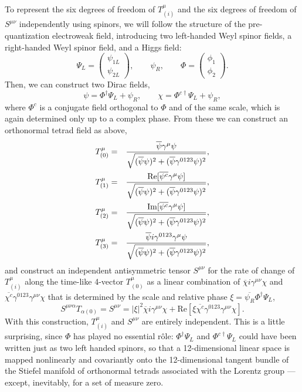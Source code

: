 \documentclass[a4paper,twocolumn,showpacs,preprintnumbers,aps]{revtex4}
\begin{document}
To represent the six degrees of freedom of $T^\mu_{(i)}$ and the six degrees of
freedom of $S^{\mu\nu}$ independently using spinors, we will follow the structure
of the pre-quantization electroweak field, introducing two left-handed Weyl spinor
fields, a right-handed Weyl spinor field, and a Higgs field:
$$\Psi_L=\left(\begin{array}{c}\psi_{1L}\\ \psi_{2L}\end{array}\right),\qquad \psi_R,\qquad
     \Phi=\left(\begin{array}{c}\phi_1\\ \phi_2\end{array}\right).$$
Then, we can construct two Dirac fields,
$$\psi=\Phi^\dagger\Psi_L+\psi_R,\qquad\chi=\Phi^{c\dagger}\Psi_L+\psi_R,$$
where $\Phi^c$ is a conjugate field orthogonal to $\Phi$ and of the same scale,
which is again determined only up to a complex phase. From these we can construct
an orthonormal tetrad field as above,
\begin{eqnarray*}
    T^\mu_{(0)}&=&\frac{\overline{\psi}\gamma^\mu\psi}{{\sqrt{(\overline{\psi}\psi)^2+(\overline{\psi}\gamma^{0123}\psi)^2}}},\cr
    T^\mu_{(1)}&=&\frac{\mathrm{Re}[\overline{\psi^c}\gamma^\mu\psi]}{{\sqrt{(\overline{\psi}\psi)^2+(\overline{\psi}\gamma^{0123}\psi)^2}}},\cr
    T^\mu_{(2)}&=&\frac{\mathrm{Im}[\overline{\psi^c}\gamma^\mu\psi]}{{\sqrt{(\overline{\psi}\psi)^2+(\overline{\psi}\gamma^{0123}\psi)^2}}},\cr
    T^\mu_{(3)}&=&\frac{\overline{\psi}i\gamma^{0123}\gamma^\mu\psi}{{\sqrt{(\overline{\psi}\psi)^2+(\overline{\psi}\gamma^{0123}\psi)^2}}},
\end{eqnarray*}
and construct an independent antisymmetric tensor $S^{\mu\nu}$ for the rate of change
of $T^\mu_{(i)}$ along the time-like 4-vector $T^\mu_{(0)}$ as a linear combination
of $\overline{\chi}i\gamma^{\mu\nu}\chi$ and
$\overline{\chi^c}\gamma^{0123}\gamma^{\mu\nu}\chi$
that is determined by the scale and relative phase
$\xi=\overline{\psi_R}\Phi^\dagger\Psi_L$, 
$$S^{\mu\nu\alpha}T_{\alpha(0)}=S^{\mu\nu}=
          |\xi|^2\overline{\chi}i\gamma^{\mu\nu}\chi+
          \mathrm{Re}[\xi\overline{\chi^c}\gamma^{0123}\gamma^{\mu\nu}\chi].$$
With this construction, $T^\mu_{(i)}$ and $S^{\mu\nu}$ are entirely independent. This is
a little surprising, since $\Phi$ has played no essential r\^ole: $\Phi^\dagger\Psi_L$
and $\Phi^{c\dagger}\Psi_L$ could have been written just as two left handed spinors, so that
a 12-dimensional linear space is mapped nonlinearly and covariantly onto the 12-dimensional
tangent bundle of the Stiefel manifold of orthonormal tetrads associated with the Lorentz group
--- except, inevitably, for a set of measure zero.
\end{document}
